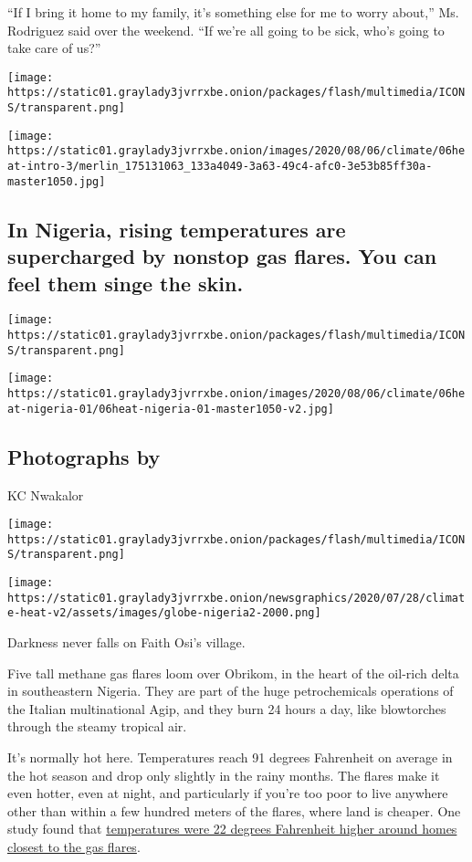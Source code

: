 ``If I bring it home to my family, it's something else for me to worry
about,'' Ms. Rodriguez said over the weekend. ``If we're all going to be
sick, who's going to take care of us?''

\texttt{[image: https://static01.graylady3jvrrxbe.onion/packages/flash/multimedia/ICONS/transparent.png]}

\texttt{[image: https://static01.graylady3jvrrxbe.onion/images/2020/08/06/climate/06heat-intro-3/merlin\_175131063\_133a4049-3a63-49c4-afc0-3e53b85ff30a-master1050.jpg]}

\hypertarget{in-nigeria-rising-temperatures-are-supercharged-by-nonstop-gas-flares-you-can-feel-them-singe-the-skin}{%
\subsection{In Nigeria, rising temperatures are supercharged by nonstop
gas flares. You can feel them singe the
skin.}\label{in-nigeria-rising-temperatures-are-supercharged-by-nonstop-gas-flares-you-can-feel-them-singe-the-skin}}

\texttt{[image: https://static01.graylady3jvrrxbe.onion/packages/flash/multimedia/ICONS/transparent.png]}

\texttt{[image: https://static01.graylady3jvrrxbe.onion/images/2020/08/06/climate/06heat-nigeria-01/06heat-nigeria-01-master1050-v2.jpg]}

\hypertarget{photographs-by-2}{%
\subsection{Photographs by}\label{photographs-by-2}}

KC Nwakalor

\texttt{[image: https://static01.graylady3jvrrxbe.onion/packages/flash/multimedia/ICONS/transparent.png]}

\texttt{[image: https://static01.graylady3jvrrxbe.onion/newsgraphics/2020/07/28/climate-heat-v2/assets/images/globe-nigeria2-2000.png]}

Darkness never falls on Faith Osi's village.

Five tall methane gas flares loom over Obrikom, in the heart of the
oil-rich delta in southeastern Nigeria. They are part of the huge
petrochemicals operations of the Italian multinational Agip, and they
burn 24 hours a day, like blowtorches through the steamy tropical air.

It's normally hot here. Temperatures reach 91 degrees Fahrenheit on
average in the hot season and drop only slightly in the rainy months.
The flares make it even hotter, even at night, and particularly if
you're too poor to live anywhere other than within a few hundred meters
of the flares, where land is cheaper. One study found that
\href{https://www.aaas.org/resources/eyes-nigeria-technical-report/gas-flaring}{temperatures
were 22 degrees Fahrenheit higher around homes closest to the gas
flares}.

